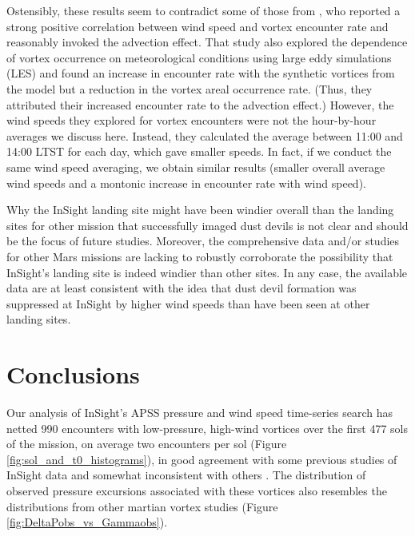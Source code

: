 \documentclass[linenumbers,trackchanges]{aastex63}
\begin{document}
{Ostensibly, these results seem to contradict some of those from \cite{Spiga2021}, who reported a strong positive correlation between wind speed and vortex encounter rate and reasonably invoked the advection effect. That study also explored the dependence of vortex occurrence on meteorological conditions using large eddy simulations (LES) and found an increase in encounter rate with the synthetic vortices from the model but a reduction in the vortex areal occurrence rate. (Thus, they attributed their increased encounter rate to the advection effect.)
However, the wind speeds they explored for vortex encounters were not the hour-by-hour averages we discuss here. Instead, they calculated the average between 11:00 and 14:00 LTST for each day, which gave smaller speeds. In fact, if we conduct the same wind speed averaging, we obtain similar results (smaller overall average wind speeds and a montonic increase in encounter rate with wind speed). 

Why the InSight landing site might have been windier overall than the landing sites for other mission that successfully imaged dust devils is not clear and should be the focus of future studies. Moreover, the comprehensive data and/or studies for other Mars missions are lacking to robustly corroborate the possibility that InSight's landing site is indeed windier than other sites. In any case, the available data are at least consistent with the idea that dust devil formation was suppressed at InSight by higher wind speeds than have been seen at other landing sites. 


}

\section{Conclusions}
\label{sec:Conclusions}

Our analysis of InSight's APSS pressure and wind speed time-series search has netted 990 encounters with low-pressure, high-wind vortices over the first 477 sols of the mission, on average two encounters per sol (Figure \ref{fig:sol_and_t0_histograms}), in good agreement with some previous studies of InSight data \citep{2021Icar..35514119L} and somewhat inconsistent with others \citep{Spiga2021}. The distribution of observed pressure excursions associated with these vortices also resembles the distributions from other martian vortex studies (Figure \ref{fig:DeltaPobs_vs_Gammaobs}). 
\end{document}
